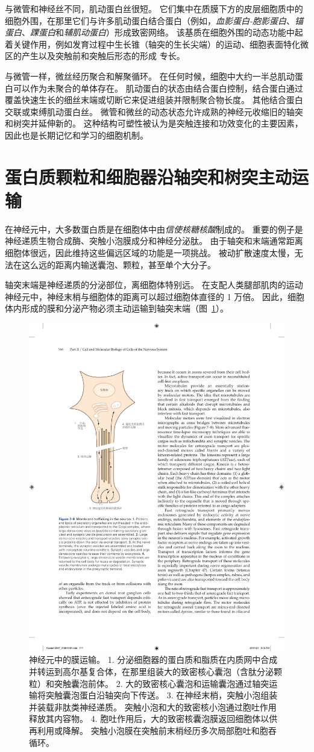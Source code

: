 与微管和神经丝不同，肌动蛋白丝很短。
它们集中在质膜下方的皮层细胞质中的细胞外围，在那里它们与许多肌动蛋白结合蛋白（例如，\textit{血影蛋白-胞影蛋白}、\textit{锚蛋白}、\textit{踝蛋白}和\textit{辅肌动蛋白}）形成致密网络。
该基质在细胞外围的动态功能中起着关键作用，例如发育过程中生长锥（轴突的生长尖端）的运动、细胞表面特化微区的产生以及突触前和突触后形态的形成 专长。


与微管一样，微丝经历聚合和解聚循环。
在任何时候，细胞中大约一半总肌动蛋白可以作为未聚合的单体存在。
肌动蛋白的状态由结合蛋白控制，结合蛋白通过覆盖快速生长的细丝末端或切断它来促进组装并限制聚合物长度。 
其他结合蛋白交联或束缚肌动蛋白丝。
微管和微丝的动态状态允许成熟的神经元收缩旧的轴突和树突并延伸新的。
这种结构可塑性被认为是突触连接和功效变化的主要因素，因此也是长期记忆和学习的细胞机制。



\section{蛋白质颗粒和细胞器沿轴突和树突主动运输}

在神经元中，大多数蛋白质是在细胞体中由\textit{信使核糖核酸}制成的。
重要的例子是神经递质生物合成酶、突触小泡膜成分和神经分泌肽。
由于轴突和末端通常距离细胞体很远，因此维持这些偏远区域的功能是一项挑战。
被动扩散速度太慢，无法在这么远的距离内输送囊泡、颗粒，甚至单个大分子。


轴突末端是神经递质的分泌部位，离细胞体特别远。
在支配人类腿部肌肉的运动神经元中，神经末梢与细胞体的距离可以超过细胞体直径的 1 万倍。
因此，细胞体内形成的膜和分泌产物必须主动运输到轴突末端（图~\ref{fig:7_9}）。


\begin{figure}[htbp]
	\centering
	\includegraphics[width=0.6\linewidth]{chap07/fig_7_9}
	\caption{神经元中的膜运输。
		1. 分泌细胞器的蛋白质和脂质在内质网中合成并转运到高尔基复合体，在那里组装大的致密核心囊泡（含肽分泌颗粒）和突触囊泡前体。
		2. 大的致密核心囊泡和运输囊泡通过轴突运输将突触囊泡蛋白沿轴突向下传送。
		3. 在神经末梢，突触小泡组装并装载非肽类神经递质。
		突触小泡和大的致密核小泡通过胞吐作用释放其内容物。
		4. 胞吐作用后，大的致密核囊泡膜返回细胞体以供再利用或降解。
		突触小泡膜在突触前末梢经历多次局部胞吐和胞吞循环。}
	\label{fig:7_9}
\end{figure}



